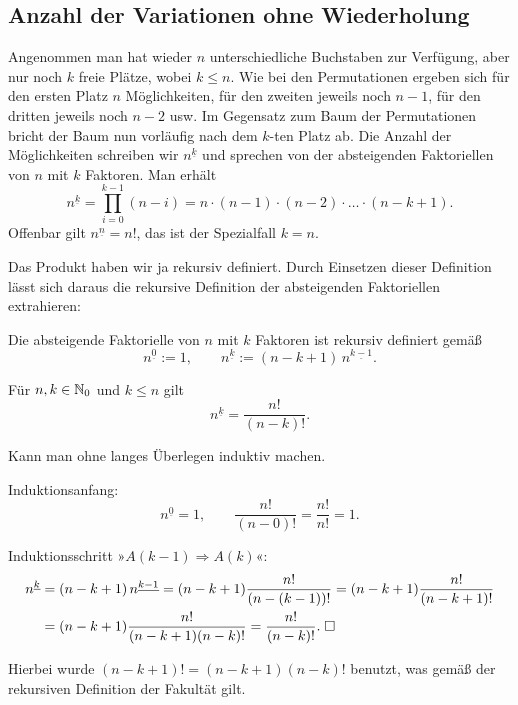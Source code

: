 \subsection{Anzahl der Variationen ohne Wiederholung}%

Angenommen man hat wieder $n$ unterschiedliche Buchstaben
zur Verfügung, aber nur noch $k$ freie Plätze, wobei $k\le n$.
Wie bei den Permutationen ergeben sich für den ersten Platz
$n$ Möglichkeiten, für den zweiten jeweils noch $n-1$,
für den dritten jeweils noch $n-2$ usw. Im Gegensatz zum
Baum der Permutationen bricht der Baum nun vorläufig
nach dem $k$-ten Platz ab. Die Anzahl der Möglichkeiten schreiben
wir $n^{\underline k}$ und sprechen von der absteigenden Faktoriellen
von $n$ mit $k$ Faktoren. Man erhält
\[n^{\underline k} = \prod_{i=0}^{k-1} (n-i) = n\cdot (n-1)\cdot (n-2)\cdot\ldots\cdot (n-k+1).\]
Offenbar gilt $n^{\underline n} = n!$, das ist der Spezialfall $k=n$.

Das Produkt haben wir ja rekursiv definiert. Durch Einsetzen dieser
Definition lässt sich daraus die rekursive Definition der absteigenden
Faktoriellen extrahieren:

\begin{Definition}%

Die absteigende Faktorielle von $n$ mit $k$ Faktoren ist rekursiv
definiert gemäß
\[n^{\underline 0} := 1,\qquad
n^{\underline k} := (n-k+1)\,n^{\underline{k-1}}.\]
\end{Definition}

\begin{Satz}
Für $n,k\in\mathbb N_0$ und $k\le n$ gilt
\[n^{\underline k} = \frac{n!}{(n-k)!}.\]
\end{Satz}
 Kann man ohne langes Überlegen induktiv
machen.

Induktionsanfang:
\[n^{\underline 0} = 1,\qquad \frac{n!}{(n-0)!}=\frac{n!}{n!}=1.\]

Induktionsschritt »$A(k-1)\Rightarrow A(k)$«:
\begin{align*}
n^{\underline k} &= (n-k+1)\,n^{\underline{k-1}}
= (n-k+1)\frac{n!}{(n-(k-1))!}
= (n-k+1)\frac{n!}{(n-k+1)!}\\
&= (n-k+1)\frac{n!}{(n-k+1)(n-k)!}
= \frac{n!}{(n-k)!}.\;\Box
\end{align*}

\noindent
Hierbei wurde $(n-k+1)!=(n-k+1)(n-k)!$ benutzt, was gemäß
der rekursiven Definition der Fakultät gilt.

